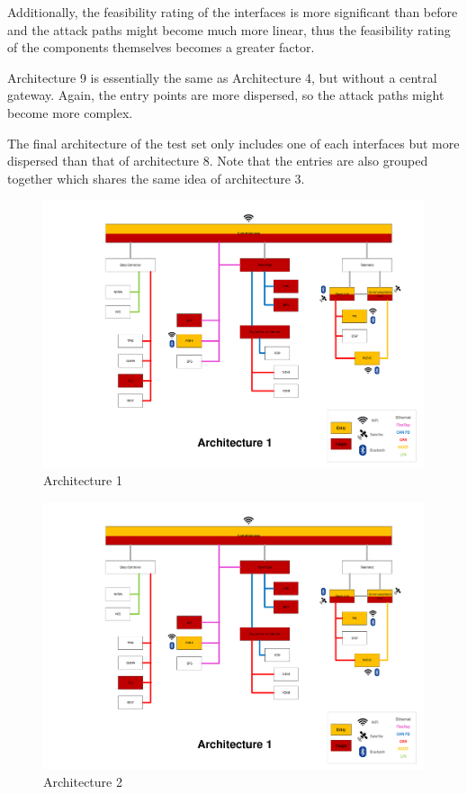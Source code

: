 Additionally, the feasibility rating of the interfaces is more significant than before and the attack paths might become much more linear, thus the feasibility rating of the components themselves becomes a greater factor.\par
Architecture 9 is essentially the same as Architecture 4, but without a central gateway.
Again, the entry points are more dispersed, so the attack paths might become more complex.\par
The final architecture of the test set only includes one of each interfaces but more dispersed than that of architecture 8.
Note that the entries are also grouped together which shares the same idea of architecture 3.\\

\newpage

\begin{figure}
    \caption{Architecture 1}
    \includegraphics[width=\textwidth, page=1]{../Architectures-survey.pdf}
\end{figure}

\begin{figure}
    \caption{Architecture 2}
    \includegraphics[width=\textwidth, page=2]{../Architectures-survey.pdf}
\end{figure}


